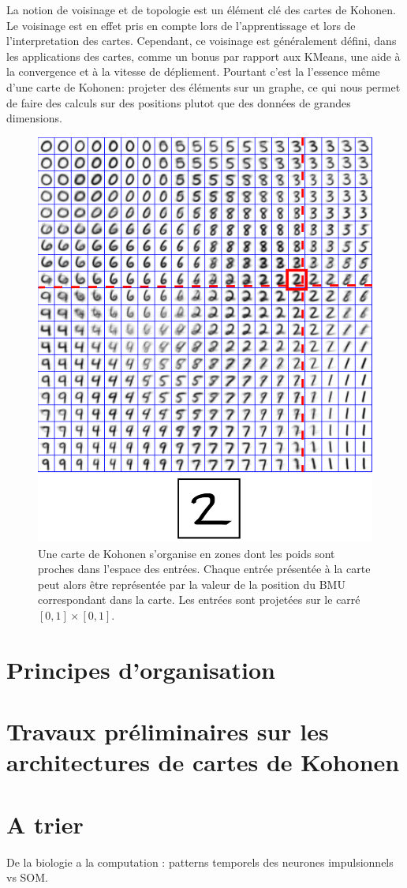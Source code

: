 La notion de voisinage et de topologie est un élément clé des cartes de Kohonen. Le voisinage est en effet pris en compte lors de l'apprentissage et lors de l'interpretation des cartes. Cependant, ce voisinage est généralement défini, dans les applications des cartes, comme un bonus par rapport aux KMeans, une aide à la convergence et à la vitesse de dépliement. Pourtant c'est la l'essence même d'une carte de Kohonen: projeter des éléments sur un graphe, ce qui nous permet de faire des calculs sur des positions plutot que des données de grandes dimensions. 
\begin{figure}
\centering
\includegraphics[width=\textwidth]{digits002.pdf}
\caption{Une carte de Kohonen s'organise en zones dont les poids sont proches dans l'espace des entrées. Chaque entrée présentée à la carte peut alors être représentée par la valeur de la position du BMU correspondant dans la carte. Les entrées sont projetées sur le carré $[0,1] \times [0,1]$.}
\end{figure}

\section{Principes d'organisation}


\section{Travaux préliminaires sur les architectures de cartes de Kohonen}



\section{A trier}
De la biologie a la computation : patterns temporels des neurones impulsionnels vs SOM. 
